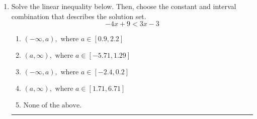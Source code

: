 \documentclass[14pt]{extbook}
\newcommand{\litem}[1]{\item#1\hspace*{-1cm}\rule{\textwidth}{0.4pt}}
\begin{document}
\begin{enumerate}
{\begin{enumerate}[label=\Alph*.]
\end{enumerate} }
\litem{
Solve the linear inequality below. Then, choose the constant and interval combination that describes the solution set.\[ -4x + 9 < 3x -3 \]\begin{enumerate}[label=\Alph*.]
\item \( (-\infty, a), \text{ where } a \in [0.9, 2.2] \)
\item \( (a, \infty), \text{ where } a \in [-5.71, 1.29] \)
\item \( (-\infty, a), \text{ where } a \in [-2.4, 0.2] \)
\item \( (a, \infty), \text{ where } a \in [1.71, 6.71] \)
\item \( \text{None of the above}. \)

\end{enumerate} }
\end{enumerate}
\end{document}
